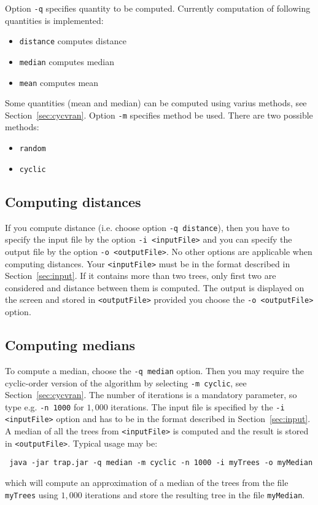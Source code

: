 \documentclass[a4paper,12pt]{amsart}
\begin{document}
\vspace{12pt}
Option \texttt{-q} specifies quantity to be computed. Currently computation of following quantities is implemented:
\begin{itemize}
  \item \texttt{distance}  computes distance 
  \item \texttt{median}  computes median 
  \item \texttt{mean}  computes mean 
\end{itemize}

\vspace{12pt}
Some quantities (mean and median) can be computed using varius methods, see Section~\ref{sec:cycvran}. Option \texttt{-m} specifies method be used. There are two possible methods:
\begin{itemize}
  \item \texttt{random}  
  \item \texttt{cyclic}   
\end{itemize}


\subsection{Computing distances}
If you compute distance (i.e. choose option \texttt{-q distance}), then you have to specify the input file by the option \texttt{-i <inputFile>} and you can specify the output file by the option \texttt{-o <outputFile>}. No other options are applicable when computing distances. Your \texttt{<inputFile>} must be in the format described in Section~\ref{sec:input}. If it contains more than two trees, only first two are considered and distance between them is computed. The output is displayed on the screen and stored in \texttt{<outputFile>} provided you choose the \texttt{-o <outputFile>} option.

\subsection{Computing medians}
To compute a median, choose the \texttt{-q median} option. Then you may require the cyclic-order version of the algorithm by selecting \texttt{-m cyclic}, see Section~\ref{sec:cycvran}. The number of iterations is a mandatory parameter, so type e.g. \texttt{-n 1000} for $1,000$ iterations. The input file is specified by the \texttt{-i <inputFile>} option and has to be in the format described in Section~\ref{sec:input}. A median of all the trees from \texttt{<inputFile>} is computed and the result is stored in \texttt{<outputFile>}. Typical usage may be:
\begin{verbatim}
 java -jar trap.jar -q median -m cyclic -n 1000 -i myTrees -o myMedian
\end{verbatim}
which will compute an approximation of a median of the trees from the file \texttt{myTrees} using $1,000$ iterations and store the resulting tree in the file \texttt{myMedian}.
\end{document}

